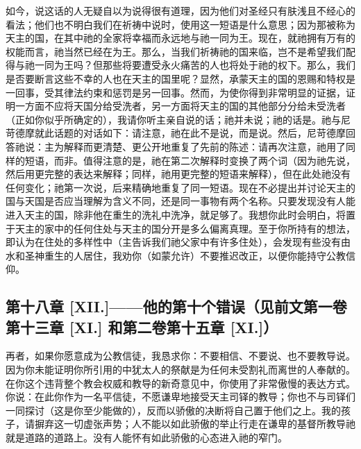 如今，说这话的人无疑自以为说得很有道理，因为他们对圣经只有肤浅且不经心的看法；他们也不明白我们在祈祷中说时，使用这一短语是什么意思；因为那被称为天主的国，在其中祂的全家将幸福而永远地与祂一同为王。现在，就祂拥有万有的权能而言，祂当然已经在为王。那么，当我们祈祷祂的国来临，岂不是希望我们配得与祂一同为王吗？但那些将要遭受永火痛苦的人也将处于祂的权下。那么，我们是否要断言这些不幸的人也在天主的国里呢？显然，承蒙天主的国的恩赐和特权是一回事，受其律法约束和惩罚是另一回事。然而，为使你得到非常明显的证据，证明一方面不应将天国分给受洗者，另一方面将天主的国的其他部分分给未受洗者（正如你似乎所确定的），我请你听主亲自说的话；祂并未说；祂的话是。祂与尼苛德摩就此话题的对话如下：请注意，祂在此不是说，而是说。然后，尼苛德摩回答祂说：主为解释而更清楚、更公开地重复了先前的陈述：请再次注意，祂用了同样的短语，而非。值得注意的是，祂在第二次解释时变换了两个词（因为祂先说，然后用更完整的表达来解释；同样，祂用更完整的短语来解释），但在此处祂没有任何变化；祂第一次说，后来精确地重复了同一短语。现在不必提出并讨论天主的国与天国是否应当理解为含义不同，还是同一事物有两个名称。只要发现没有人能进入天主的国，除非他在重生的洗礼中洗净，就足够了。我想你此时会明白，将置于天主的家中的任何住处与天主的国分开是多么偏离真理。至于你所持有的想法，即认为在住处的多样性中（主告诉我们祂父家中有许多住处），会发现有些没有由水和圣神重生的人居住，我劝你（如蒙允许）不要推迟改正，以便你能持守公教信仰。\par


\subsection{第十八章 [XII.]——他的第十个错误（见前文第一卷第十三章 [XI.] 和第二卷第十五章 [XI.]）}

再者，如果你愿意成为公教信徒，我恳求你：不要相信、不要说、也不要教导说。因为你未能证明你所引用的中犹太人的祭献是为任何未受割礼而离世的人奉献的。在你这个违背整个教会权威和教导的新奇意见中，你使用了非常傲慢的表达方式。你说：在此你作为一名平信徒，不愿谦卑地接受天主司铎的教导；你也不与司铎们一同探讨（这是你至少能做的），反而以骄傲的决断将自己置于他们之上。我的孩子，请摒弃这一切虚张声势；人不能以如此骄傲的举止行走在谦卑的基督所教导祂就是道路的道路上。没有人能怀有如此骄傲的心态进入祂的窄门。\par


